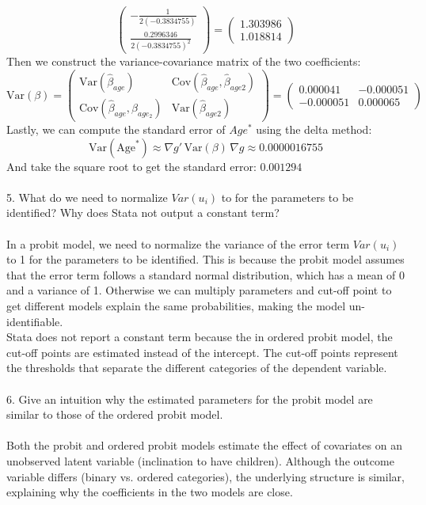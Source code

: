 \documentclass[12pt]{article}
\begin{document}
\begin{flushleft}
\[\begin{pmatrix}
-\frac{1}{2(-0.3834755)} \\
\frac{0.2996346}{2(-0.3834755)^2}
\end{pmatrix}
=
\begin{pmatrix}
    1.303986\\
    1.018814
\end{pmatrix}
\]
Then we construct the variance-covariance matrix of the two coefficients:
\[
\text{Var}(\beta) =
\begin{pmatrix}
\text{Var}(\hat{\beta}_{age}) & \text{Cov}(\hat{\beta}_{age}, \hat{\beta}_{age2}) \\
\text{Cov}(\hat{\beta}_{age}, \hat{\beta}_{age_2}) & \text{Var}(\hat{\beta}_{age2})
\end{pmatrix}
=
\begin{pmatrix}
    0.000041 & -0.000051\\
    -0.000051 & 0.000065
\end{pmatrix}
\]
Lastly, we can compute the standard error of $Age^*$ using the delta method:
\[
\text{Var}(\text{Age}^*) \approx \nabla g' \, \text{Var}(\beta) \, \nabla g \approx 0.0000016755
\]
And take the square root to get the standard error: $0.001294$\\~\\
5. What do we need to normalize $Var(u_i)$ to for the parameters to be identified? Why
does Stata not output a constant term?\\~\\
In a probit model, we need to normalize the variance of the error term $Var(u_i)$ to 1 for the parameters to be identified. This is because the probit model assumes that the error term follows a standard normal distribution, which has a mean of 0 and a variance of 1. Otherwise we can multiply parameters and cut-off point to get different models explain the same probabilities, making the model un-identifiable.\\
Stata does not report a constant term because the in ordered probit model, the cut-off points are estimated instead of the intercept. The cut-off points represent the thresholds that separate the different categories of the dependent variable. \\~\\
6. Give an intuition why the estimated parameters for the probit model are similar to
those of the ordered probit model.\\~\\
Both the probit and ordered probit models estimate the effect of covariates on an unobserved latent variable (inclination to have children). Although the outcome variable differs (binary vs. ordered categories), the underlying structure is similar, explaining why the coefficients in the two models are close.\\~\\

\end{flushleft}
\end{document}
